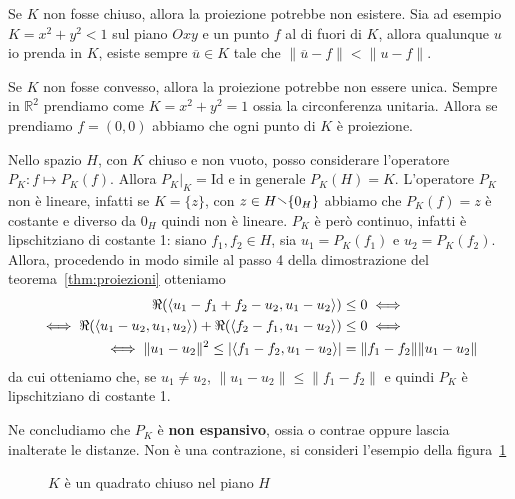 \begin{remark}
    Se \(K\) non fosse chiuso, allora la proiezione potrebbe
    non esistere. Sia ad esempio \(K = x^2 + y^2 < 1\) sul piano \(Oxy\) e un
    punto \(f\) al di fuori di \(K\), allora qualunque \(u\) io prenda in \(K\),
    esiste sempre \(\overline{u} \in K\) tale che \(\|\overline{u} - f\| < \|u
    -f\|\).

    Se \(K\) non fosse convesso, allora la proiezione potrebbe non essere unica.
    Sempre in \(\mathbb{R}^2\) prendiamo come \(K = x^2 + y^2 = 1\) ossia la
    circonferenza unitaria. Allora se prendiamo \(f = (0, 0)\) abbiamo che ogni
    punto di \(K\) è proiezione.
\end{remark}

Nello spazio \(H\), con \(K\) chiuso e non vuoto, posso considerare l'operatore
\(P_K : f \mapsto P_K{(f)}\). Allora \(P_K|_K = \text{Id}\) e in generale
\(P_K{(H)} = K\). L'operatore \(P_K\) non è lineare, infatti se \(K = \{z\} \),
con \(z \in H \sminus \{0_H\} \) abbiamo che \(P_K{(f)}= z\) è costante e
diverso da \(0_H\) quindi non è lineare. \(P_K\) è però continuo, infatti è
lipschitziano di costante 1: siano \(f_{1}, f_{2} \in H\), sia \(u_{1} =
P_K{(f_{1})}\) e \(u_{2} = P_K{(f_{2})}\). Allora, procedendo in modo simile
al passo 4 della dimostrazione del teorema~\ref{thm:proiezioni} otteniamo
\begin{align*}
    \Re{({\left\langle u_{1} - f_{1} + f_{2} - u_{2}, u_{1} - u_{2}\right\rangle})} &\le 0  \iff \\
    \iff \Re{({\left\langle u_{1} - u_{2}, u_{1}, u_{2}\right\rangle} )} + \Re{({\left\langle f_{2} - f_{1},
u_{1} - u_{2}\right\rangle})} &\le 0 \iff \\
    \iff \|u_{1}-u_{2}\|^2 \le \left| \left<f_{1}-f_{2}, u_{1}-u_{2} \right>
\right| &= \|f_{1} -f_{2}\|\|u_{1} - u_{2}\| 
\end{align*}
da cui otteniamo che, se \(u_{1} \neq u_{2}\), \(\|u_{1} - u_{2}\| \le \|f_{1}
- f_{2}\|\) e quindi \(P_K\) è lipschitziano di costante 1.

Ne concludiamo che \(P_K\) è \textbf{non espansivo}, ossia o contrae oppure
lascia inalterate le distanze. Non è una contrazione, si consideri l'esempio
della figura~\ref{fig:quadrato}

\begin{figure}[ht]
    \centering
    \caption{\(K\) è un quadrato chiuso nel piano \(H\)}\label{fig:quadrato}
\end{figure}

